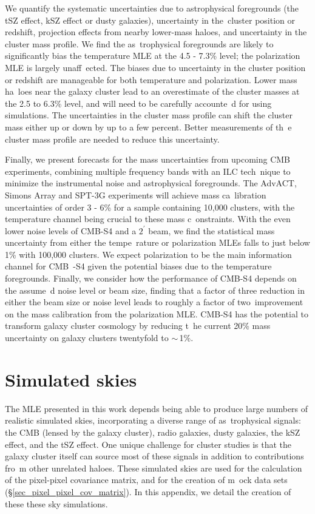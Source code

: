 We quantify the systematic uncertainties due to astrophysical foregrounds (the tSZ effect, kSZ effect or dusty galaxies), uncertainty in the\
 cluster position or redshift, projection effects from nearby lower-mass haloes, and uncertainty in the cluster mass profile. We find the as\
trophysical foregrounds are likely to significantly bias the temperature MLE at the 4.5 - 7.3\% level; the polarization MLE is largely unaff\
ected. The biases due to uncertainty in the cluster position or redshift are manageable for both temperature and polarization. Lower mass ha\
loes near the galaxy cluster lead to an overestimate of the cluster masses at the 2.5 to 6.3\% level, and will need to be carefully accounte\
d for using simulations.
The uncertainties in the cluster mass profile can shift the cluster mass either up or down by up to a few percent. Better measurements of th\
e cluster mass profile are needed to reduce this uncertainty.

Finally, we present forecasts for the mass uncertainties from upcoming CMB experiments,  combining multiple frequency bands with an ILC tech\
nique to minimize the instrumental noise and astrophysical foregrounds. The AdvACT, Simons Array and SPT-3G experiments will achieve mass ca\
libration uncertainties of order 3 - 6\% for a sample containing 10,000 clusters, with the temperature channel being crucial to these mass c\
onstraints. With the even lower noise levels of CMB-S4 and a $2^\prime$ beam, we find the statistical mass uncertainty from either the tempe\
rature or polarization MLEs falls to just below 1\% with 100,000 clusters. We expect polarization to be the main information channel for CMB\
-S4 given the potential biases  due to the temperature foregrounds. Finally, we consider how the performance of CMB-S4 depends on the assume\
d noise level or beam size, finding that a factor of three reduction in either the beam size or noise level leads to roughly a factor of two\
 improvement on the mass calibration from the polarization MLE. CMB-S4 has the potential to transform galaxy cluster cosmology by reducing t\
he current 20\% mass uncertainty on galaxy clusters twentyfold to $\sim$\,1\%.

\section{Simulated skies}
\label{sec_appendix}
The MLE presented in this work depends being able to produce large numbers of realistic simulated skies, incorporating a diverse range of as\
trophysical signals: the CMB (lensed by the galaxy cluster), radio galaxies, dusty galaxies, the kSZ effect, and the tSZ effect.
One unique challenge for cluster studies is that the galaxy cluster itself can source most of these signals in addition to contributions fro\
m other unrelated haloes. These simulated skies are used for the calculation of the pixel-pixel covariance matrix, and for the creation of m\
ock data sets (\S\ref{sec_pixel_pixel_cov_matrix}). In this appendix, we detail the creation of these these sky simulations.

